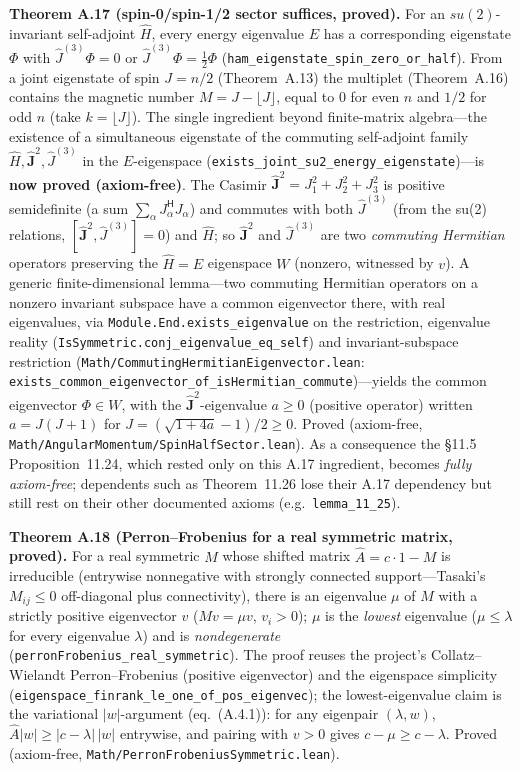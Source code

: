 \documentclass[a4paper,11pt]{article}
\begin{document}
\medskip\noindent\textbf{Theorem A.17 (spin-0/spin-1/2 sector suffices, proved).}  For an
$su(2)$-invariant self-adjoint $\hat H$, every energy eigenvalue $E$ has a corresponding eigenstate
$\Phi$ with $\hat J^{(3)}\Phi=0$ or $\hat J^{(3)}\Phi=\tfrac12\Phi$ (\texttt{ham\_eigenstate\_spin\_zero\_or\_half}).
From a joint eigenstate of spin $J=n/2$ (Theorem~A.13) the multiplet (Theorem~A.16) contains the
magnetic number $M=J-\lfloor J\rfloor$, equal to $0$ for even $n$ and $1/2$ for odd $n$ (take
$k=\lfloor J\rfloor$).  The single ingredient beyond finite-matrix algebra---the existence of a
simultaneous eigenstate of the commuting self-adjoint family $\hat H,\hat{\boldsymbol J}^2,\hat J^{(3)}$
in the $E$-eigenspace (\texttt{exists\_joint\_su2\_energy\_eigenstate})---is \textbf{now proved
(axiom-free)}.  The Casimir $\hat{\boldsymbol J}^2=J_1^2+J_2^2+J_3^2$ is positive semidefinite (a sum
$\sum_\alpha J_\alpha^{\mathsf H}J_\alpha$) and commutes with both $\hat J^{(3)}$ (from the su(2)
relations, $[\hat{\boldsymbol J}^2,\hat J^{(3)}]=0$) and $\hat H$; so $\hat{\boldsymbol J}^2$ and
$\hat J^{(3)}$ are two \emph{commuting Hermitian} operators preserving the $\hat H=E$ eigenspace $W$
(nonzero, witnessed by $v$).  A generic finite-dimensional lemma---two commuting Hermitian operators on
a nonzero invariant subspace have a common eigenvector there, with real eigenvalues, via
\texttt{Module.End.exists\_eigenvalue} on the restriction, eigenvalue reality
(\texttt{IsSymmetric.conj\_eigenvalue\_eq\_self}) and invariant-subspace restriction
(\texttt{Math/CommutingHermitianEigenvector.lean}: \texttt{exists\_common\_eigenvector\_of\_isHermitian\_commute})---yields
the common eigenvector $\Phi\in W$, with the $\hat{\boldsymbol J}^2$-eigenvalue $a\ge0$ (positive
operator) written $a=J(J+1)$ for $J=(\sqrt{1+4a}-1)/2\ge0$.  Proved (axiom-free,
\texttt{Math/AngularMomentum/SpinHalfSector.lean}).  As a consequence the §11.5 Proposition~11.24,
which rested only on this A.17 ingredient, becomes \emph{fully axiom-free}; dependents such as
Theorem~11.26 lose their A.17 dependency but still rest on their other documented axioms (e.g.\
\texttt{lemma\_11\_25}).

\medskip\noindent\textbf{Theorem A.18 (Perron--Frobenius for a real symmetric matrix, proved).}
For a real symmetric $M$ whose shifted matrix $\hat A=c\cdot1-M$ is irreducible (entrywise
nonnegative with strongly connected support---Tasaki's $M_{ij}\le0$ off-diagonal plus
connectivity), there is an eigenvalue $\mu$ of $M$ with a strictly positive eigenvector $v$
($M v=\mu v$, $v_i>0$); $\mu$ is the \emph{lowest} eigenvalue ($\mu\le\lambda$ for every eigenvalue
$\lambda$) and is \emph{nondegenerate} (\texttt{perronFrobenius\_real\_symmetric}).  The proof reuses
the project's Collatz--Wielandt Perron--Frobenius (positive eigenvector) and the eigenspace
simplicity (\texttt{eigenspace\_finrank\_le\_one\_of\_pos\_eigenvec}); the lowest-eigenvalue claim is
the variational $|w|$-argument (eq.~(A.4.1)): for any eigenpair $(\lambda,w)$, $\hat A|w|\ge|c-\lambda|\,|w|$
entrywise, and pairing with $v>0$ gives $c-\mu\ge c-\lambda$.  Proved (axiom-free,
\texttt{Math/PerronFrobeniusSymmetric.lean}).
\end{document}
